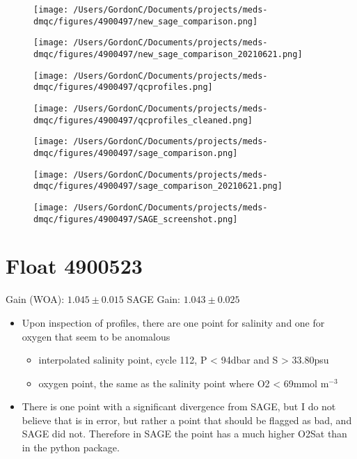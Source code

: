 \begin{figure}[H]
	\centering
	\texttt{[image: /Users/GordonC/Documents/projects/meds-dmqc/figures/4900497/new\_sage\_comparison.png]}
	\caption{}
\end{figure}


\begin{figure}[H]
	\centering
	\texttt{[image: /Users/GordonC/Documents/projects/meds-dmqc/figures/4900497/new\_sage\_comparison\_20210621.png]}
	\caption{}
\end{figure}


\begin{figure}[H]
	\centering
	\texttt{[image: /Users/GordonC/Documents/projects/meds-dmqc/figures/4900497/qcprofiles.png]}
	\caption{}
\end{figure}


\begin{figure}[H]
	\centering
	\texttt{[image: /Users/GordonC/Documents/projects/meds-dmqc/figures/4900497/qcprofiles\_cleaned.png]}
	\caption{}
\end{figure}


\begin{figure}[H]
	\centering
	\texttt{[image: /Users/GordonC/Documents/projects/meds-dmqc/figures/4900497/sage\_comparison.png]}
	\caption{}
\end{figure}


\begin{figure}[H]
	\centering
	\texttt{[image: /Users/GordonC/Documents/projects/meds-dmqc/figures/4900497/sage\_comparison\_20210621.png]}
	\caption{}
\end{figure}


\begin{figure}[H]
	\centering
	\texttt{[image: /Users/GordonC/Documents/projects/meds-dmqc/figures/4900497/SAGE\_screenshot.png]}
	\caption{}
\end{figure}

\section{Float 4900523}

Gain (WOA): $1.045 \pm 0.015$
SAGE Gain: $1.043 \pm 0.025$

\begin{itemize}
	\item Upon inspection of profiles, there are one point for salinity and one for oxygen that seem to be anomalous
	\begin{itemize}
		\item interpolated salinity point, cycle 112, P < 94dbar and S > 33.80psu
		\item oxygen point, the same as the salinity point where O2 < 69mmol m$^{-3}$
	\end{itemize}
	\item There is one point with a significant divergence from SAGE, but I do not believe that is in error, but rather a point that should be flagged as bad, and SAGE did not. Therefore in SAGE the point has a much higher O2Sat than in the python package.
\end{itemize}


